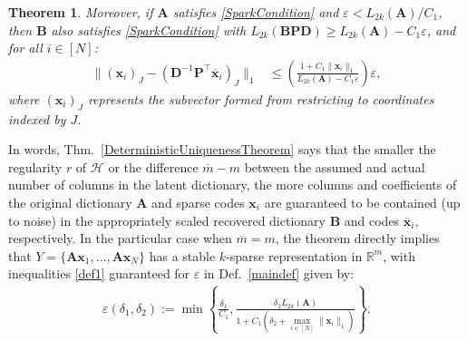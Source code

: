 \documentclass[journal, twocolumn]{IEEEtran}
\newtheorem{theorem}{Theorem}
\begin{document}
\begin{theorem}
Moreover, if $\mathbf{A}$ satisfies \eqref{SparkCondition} and $\varepsilon < L_{2k}(\mathbf{A}) / C_1$, then $\mathbf{B}$ also satisfies \eqref{SparkCondition} with $L_{2k}(\mathbf{B}\mathbf{PD}) \geq L_{2k}(\mathbf{A}) - C_1 \varepsilon$, and for all $i \in [N]$:
\begin{align}\label{b-PDa}
\|(\mathbf{x}_i)_J - (\mathbf{D}^{-1}\mathbf{P}^{\top} \mathbf{\overline x}_i)_J\|_1 &\leq  \left( \frac{ 1+C_1 \|\mathbf{x}_i\|_1 }{ L_{2k}(\mathbf{A}) -  C_1\varepsilon } \right) \varepsilon,
\end{align}
%
where $(\mathbf{x}_i)_J$ represents the subvector formed from restricting to coordinates indexed by $J$. 
\end{theorem}

In words, Thm.~\ref{DeterministicUniquenessTheorem} says that the smaller the regularity $r$ of $\mathcal{H}$ or the difference $\overline m - m$ between the assumed and actual number of columns in the latent dictionary, the more columns and coefficients of the original dictionary $\mathbf{A}$ and sparse codes $\mathbf{x}_i$ are guaranteed to be contained (up to noise) in the appropriately scaled recovered dictionary $\mathbf{B}$ and codes $\mathbf{\overline x}_i$, respectively. In the particular case when $\overline m = m$, the theorem directly implies that  $Y = \{\mathbf{Ax}_1, \ldots, \mathbf{Ax}_N\}$ has a stable $k$-sparse representation in $\mathbb{R}^m$, with inequalities \eqref{def1} guaranteed for $\varepsilon$ in Def.~\ref{maindef} given by: 
\begin{align}\label{epsdel}
\varepsilon(\delta_1, \delta_2) := \min \left\{ \frac{\delta_1}{ C_1 }, \frac{ \delta_2 L_{2k}(\mathbf{A})}{ 1 + C_1 \left( \delta_2 + \max_{i \in [N]} \|\mathbf{x}_i\|_1  \right) } \right\}.
\end{align}
\end{document}
